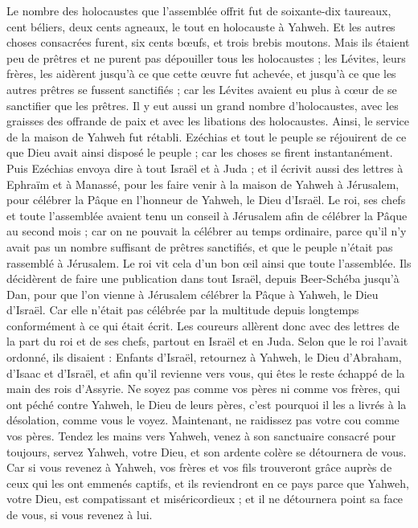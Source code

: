 \begin{multicols}{2}
Le nombre des holocaustes que l'assemblée offrit fut de soixante-dix taureaux, cent béliers, deux cents agneaux, le tout en holocauste à Yahweh.
Et les autres choses consacrées furent, six cents bœufs, et trois brebis moutons.
Mais ils étaient peu de prêtres et ne purent pas dépouiller tous les holocaustes ; les Lévites, leurs frères, les aidèrent jusqu'à ce que cette œuvre fut achevée, et jusqu'à ce que les autres prêtres se fussent sanctifiés ; car les Lévites avaient eu plus à cœur de se sanctifier que les prêtres.
Il y eut aussi un grand nombre d'holocaustes, avec les graisses des offrande de paix et avec les libations des holocaustes. Ainsi, le service de la maison de Yahweh fut rétabli.
Ezéchias et tout le peuple se réjouirent de ce que Dieu avait ainsi disposé le peuple ; car les choses se firent instantanément.
\VerseOne{}Puis Ezéchias envoya dire à tout Israël et à Juda ; et il écrivit aussi des lettres à Ephraïm et à Manassé, pour les faire venir à la maison de Yahweh à Jérusalem, pour célébrer la Pâque en l'honneur de Yahweh, le Dieu d'Israël.
Le roi, ses chefs et toute l'assemblée avaient tenu un conseil à Jérusalem afin de célébrer la Pâque au second mois ;
car on ne pouvait la célébrer au temps ordinaire, parce qu'il n'y avait pas un nombre suffisant de prêtres sanctifiés, et que le peuple n'était pas rassemblé à Jérusalem.
Le roi vit cela d'un bon œil ainsi que toute l'assemblée.
Ils décidèrent de faire une publication dans tout Israël, depuis Beer-Schéba jusqu'à Dan, pour que l'on vienne à Jérusalem célébrer la Pâque à Yahweh, le Dieu d'Israël. Car elle n'était pas célébrée par la multitude depuis longtemps conformément à ce qui était écrit.
Les coureurs allèrent donc avec des lettres de la part du roi et de ses chefs, partout en Israël et en Juda. Selon que le roi l'avait ordonné, ils disaient : Enfants d'Israël, retournez à Yahweh, le Dieu d'Abraham, d'Isaac et d'Israël, et afin qu'il revienne vers vous, qui êtes le reste échappé de la main des rois d'Assyrie.
Ne soyez pas comme vos pères ni comme vos frères, qui ont péché contre Yahweh, le Dieu de leurs pères, c'est pourquoi il les a livrés à la désolation, comme vous le voyez.
Maintenant, ne raidissez pas votre cou comme vos pères. Tendez les mains vers Yahweh, venez à son sanctuaire consacré pour toujours, servez Yahweh, votre Dieu, et son ardente colère se détournera de vous.
Car si vous revenez à Yahweh, vos frères et vos fils trouveront grâce auprès de ceux qui les ont emmenés captifs, et ils reviendront en ce pays parce que Yahweh, votre Dieu, est compatissant et miséricordieux ; et il ne détournera point sa face de vous, si vous revenez à lui.

\end{multicols}
